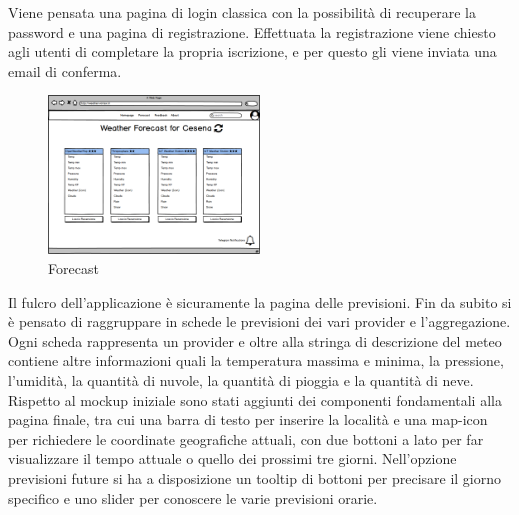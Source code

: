 Viene pensata una pagina di login classica con la possibilità di recuperare la password e una pagina di registrazione. Effettuata la registrazione viene chiesto agli utenti di completare la propria iscrizione, e per questo gli viene inviata una email di conferma.

\begin{figure}[H]
    \caption{Forecast}
    \label{fig:Home}
    \centering
    \includegraphics[width=0.5\textwidth]{MockUps/forecast.png}
\end{figure}
Il fulcro dell'applicazione è sicuramente la pagina delle previsioni. Fin da subito si è pensato di raggruppare in schede le previsioni dei vari provider e l'aggregazione. Ogni scheda rappresenta un provider e oltre alla stringa di descrizione del meteo contiene altre informazioni quali la temperatura massima e minima, la pressione, l'umidità, la quantità di nuvole, la quantità di pioggia e la quantità di neve. 
Rispetto al mockup iniziale sono stati aggiunti dei componenti fondamentali alla pagina finale, tra cui una barra di testo per inserire la località e una map-icon per richiedere le coordinate geografiche attuali, con due bottoni a lato per far visualizzare il tempo attuale o quello dei prossimi tre giorni. Nell'opzione previsioni future si ha a disposizione un tooltip di bottoni per precisare il giorno specifico e uno slider per conoscere le varie previsioni orarie.

